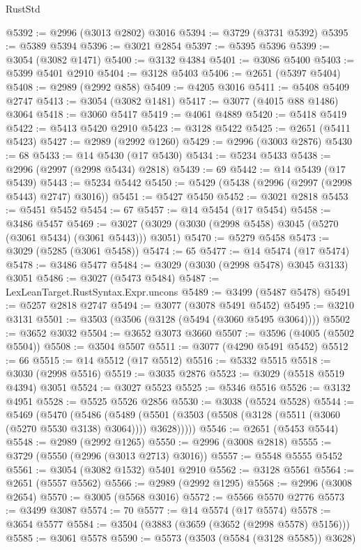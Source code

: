 \begin{lexlean}{RustStd}
\begin{coremodule}
@5392 := @2996 (@3013 @2802) @3016
@5394 := @3729 (@3731 @5392)
@5395 := @5389 @5394
@5396 := @3021 @2854
@5397 := @5395 @5396
@5399 := @3054 (@3082 @1471)
@5400 := @3132 @4384
@5401 := @3086 @5400
@5403 := @5399 @5401 @2910
@5404 := @3128 @5403
@5406 := @2651 (@5397 @5404)
@5408 := @2989 (@2992 @858)
@5409 := @4205 @3016
@5411 := @5408 @5409 @2747
@5413 := @3054 (@3082 @1481)
@5417 := @3077 (@4015 @88 @1486) @3064
@5418 := @3060 @5417
@5419 := @4061 @4889
@5420 := @5418 @5419
@5422 := @5413 @5420 @2910
@5423 := @3128 @5422
@5425 := @2651 (@5411 @5423)
@5427 := @2989 (@2992 @1260)
@5429 := @2996 (@3003 @2876)
@5430 := 68
@5433 := @14 @5430 (@17 @5430)
@5434 := @5234 @5433
@5438 := @2996 (@2997 (@2998 @5434) @2818)
@5439 := 69
@5442 := @14 @5439 (@17 @5439)
@5443 := @5234 @5442
@5450 := @5429 (@5438 (@2996 (@2997 (@2998 @5443) @2747) @3016))
@5451 := @5427 @5450
@5452 := @3021 @2818
@5453 := @5451 @5452
@5454 := 67
@5457 := @14 @5454 (@17 @5454)
@5458 := @3486 @5457
@5469 := @3027 (@3029 (@3030 (@2998 @5458) @3045 (@5270 (@3061 @5434) (@3061 @5443))) @3051)
@5470 := @5279 @5458
@5473 := @3029 (@5285 (@3061 @5458))
@5474 := 65
@5477 := @14 @5474 (@17 @5474)
@5478 := @3486 @5477
@5484 := @3029 (@3030 (@2998 @5478) @3045 @3133) @3051
@5486 := @3027 (@5473 @5484)
@5487 := LexLeanTarget.RustSyntax.Expr.uncons
@5489 := @3499 (@5487 @5478)
@5491 := @5257 @2818 @2747
@5494 := @3077 (@3078 @5491 @5452)
@5495 := @3210 @3131
@5501 := @3503 (@3506 (@3128 (@5494 (@3060 @5495 @3064))))
@5502 := @3652 @3032
@5504 := @3652 @3073 @3660
@5507 := @3596 (@4005 (@5502 @5504))
@5508 := @3504 @5507
@5511 := @3077 (@4290 @5491 @5452)
@5512 := 66
@5515 := @14 @5512 (@17 @5512)
@5516 := @5332 @5515
@5518 := @3030 (@2998 @5516)
@5519 := @3035 @2876
@5523 := @3029 (@5518 @5519 @4394) @3051
@5524 := @3027 @5523
@5525 := @5346 @5516
@5526 := @3132 @4951
@5528 := @5525 @5526 @2856
@5530 := @3038 (@5524 @5528)
@5544 := @5469
    (@5470
      (@5486
        (@5489 (@5501 (@3503 (@5508 (@3128 (@5511 (@3060 (@5270 @5530 @3138) @3064)))) @3628)))))
@5546 := @2651 (@5453 @5544)
@5548 := @2989 (@2992 @1265)
@5550 := @2996 (@3008 @2818)
@5555 := @3729 (@5550 (@2996 (@3013 @2713) @3016))
@5557 := @5548 @5555 @5452
@5561 := @3054 (@3082 @1532) @5401 @2910
@5562 := @3128 @5561
@5564 := @2651 (@5557 @5562)
@5566 := @2989 (@2992 @1295)
@5568 := @2996 (@3008 @2654)
@5570 := @3005 (@5568 @3016)
@5572 := @5566 @5570 @2776
@5573 := @3499 @3087
@5574 := 70
@5577 := @14 @5574 (@17 @5574)
@5578 := @3654 @5577
@5584 := @3504 (@3883 (@3659 (@3652 (@2998 @5578) @5156)))
@5585 := @3061 @5578
@5590 := @5573 (@3503 (@5584 (@3128 @5585)) @3628)

\end{coremodule}
\end{lexlean}
